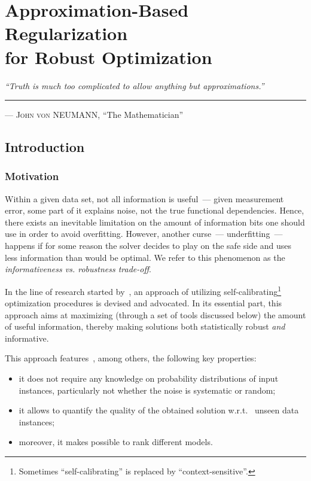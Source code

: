 \chapter[Approximation-Based Regularization for Robust Optimization]{Approximation-Based Regularization \\ for Robust Optimization}
\label{ch:gen_appch}

\hfill
\begin{minipage}[t]{.75\textwidth}
\textit{``Truth is much too complicated to allow anything but approximations.''} \\
  \hrule
  \vspace{.2cm}
  \hfill
  \textsc{--- John von NEUMANN}, ``The Mathematician''
\end{minipage}

\section{Introduction}

\subsection{Motivation}

Within a given data set, not all information is useful~--- given measurement
error, some part of it explains noise, not the true functional dependencies.
Hence, there exists an inevitable limitation on the amount of information bits
one should use in order to avoid overfitting. However, another curse~---
underfitting~--- happens if for some reason the solver decides to play on the
safe side and uses less information than would be optimal. We refer to this
phenomenon as the \textit{informativeness vs. robustness trade-off}.

In the line of research started
by~\citet{conf/isit/Buhmann10,conf/mcpr2/Buhmann11}, an approach of utilizing
self-calibrating\footnote{Sometimes ``self-calibrating'' is replaced by
``context-sensitive''.} optimization procedures is devised and advocated. In its
essential part, this approach aims at maximizing (through a set of tools
discussed below) the amount of useful information, thereby making 
solutions both statistically robust \textit{and} informative.

This approach features~\citep[cf.][]{Busetto:PhD,jcss:2017}, among others, the following key
properties: 
\begin{itemize}
  \item it does not require any knowledge on
    probability distributions of input instances, particularly not whether the
    noise is systematic or random;
  \item it allows to quantify the quality of the obtained solution w.r.t.~ 
    unseen data instances;
  \item moreover, it makes possible to rank different models.
\end{itemize}

